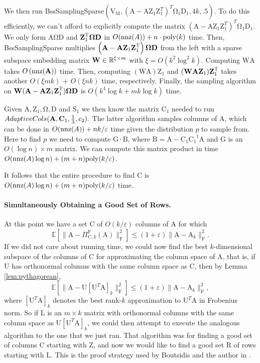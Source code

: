 \documentclass[11pt]{article}
\newcommand{\R}{\ensuremath\mathbb{R}}
\newcommand{\Expect}[1]{\mbox{}{\mathbb{E}}\left[#1\right]}
\newcommand{\FNormS}[1]{\mbox{}\|#1\|_\mathrm{F}^2}
\newcommand{\pinv}[1]{ {#1}^\dagger}
\newcommand{\transp}{^{\textsc{T}}}
\newcommand{\mat}[1]{{\ensuremath{\bm{\mathrm{#1}}}}}
\def\matA{\mat{A}}
\def\matB{\mat{B}}
\def\matC{\mat{C}}
\def\matD{\mat{D}}
\def\matG{\mat{G}}
\def\matL{\mat{L}}
\def\matM{\mat{M}}
\def\matR{\mat{R}}
\def\matS{\mat{S}}
\def\matU{\mat{U}}
\def\matV{\mat{V}}
\def\matW{\mat{W}}
\def\matZ{\mat{Z}}
\def\matOmega{\mat{\Omega}}
\def\matOmega{\mat{\Omega}}
\def\nnz{{ \rm nnz }}
\def\frac#1#2{{#1\over #2}}
\newcommand{\eps}{\varepsilon}
\newcommand{\poly}{{\mathrm{poly}}}
\begin{document}
We then run 
{\textsc BssSamplingSparse}$(\matV_{\matM},  (\matA-\matA\matZ_1\matZ_1^T)^T \mat\Omega_1\matD_1, 4k, .5)$.
To do this efficiently, we can't afford to explicitly compute the matrix
$(\matA-\matA\matZ_1\matZ_1^T)^T \mat\Omega_1\matD_1$. 
We only form  $\matA\matOmega \matD$ and $\matZ_1\transp \matOmega \matD$ in $O(\nnz(A)) + n \cdot \poly(k)$ time. 
Then, {\textsc BssSamplingSparse} multiplies 
$\left(\matA - \matA \matZ_1\matZ_1\transp\right)\matOmega \matD$
from the left with a sparse subspace embedding matrix $\matW \in \R^{\xi \times m}$ with 
$\xi = O( k^2 \log^2 k)$. Computing $\matW \matA$ takes $O\left(  \nnz(\matA) \right)$ time.
Then, computing $(\matW\matA) \matZ_1$ and $(\matW\matA\matZ_1)\matZ_1\transp$ takes another 
$O(\xi m k)$ + $O(\xi n k)$ time, respectively. Finally, the sampling algorithm on
$\matW (\matA - \matA \matZ_1\matZ_1\transp)\matOmega \matD$ is $O( k^4 \log k + m k \log k)$ time.

Given $\matA, \matZ_1, \mat\Omega, \matD$ and $\matS_1$ we then know the matrix $\matC_1$ needed to run
$AdaptiveCols(\matA, \matC_1, \frac{1}{3}, c_2).$ The latter algorithm samples columns of $\matA$,
which can be done in $O(\nnz(A)) + n k/\eps$ time given the distribution $p$ to sample from. Here to find
$p$ we need to compute $\matG \cdot \matB$, where $\matB = \matA-\matC_1 \pinv{\matC_1} \matA$ and $\matG$ is 
an $O(\log n) \times m$ matrix. We can compute this matrix product in time $O(\nnz(A) \log n) + (m+n)\poly(k/\eps)$. 

It follows that the entire procedure to find $\matC$ is $O(\nnz(A) \log n) + (m+n) \poly(k/\eps)$ time. 

\paragraph{Simultaneously Obtaining a Good Set of Rows.}
At this point we have a set $\matC$ of $O(k/\eps)$ columns of $\matA$ for which
$$\Expect{ \FNormS{ \matA - \Pi_{\matC,k}^{\mathrm{F}}(\matA) } } \le (1+\eps) \FNormS{\matA - \matA_k }.$$
If we did not care about running time, we could now find the best $k$-dimensional subspace of the columns of
$\matC$ for approximating the column space of $\matA$, that is, if $\matU$ has orthonormal columns with the
same column space as $\matC$, then by Lemma \ref{lem:pythagorean},
$$\Expect{ \FNormS{ \matA - \matU [\matU^T\matA]_k } }\le (1+\eps) \FNormS{\matA - \matA_k },$$
where $[\matU^T\matA]_k$ denotes the best rank-$k$ approximation to $\matU^T\matA$ in Frobenius norm. So if
$\matL$ is an $m \times k$ matrix with orthonormal columns with the same column space as 
$\matU [\matU^T\matA]_k$, we could then attempt to execute the analogous algorithm to the one that 
we just ran. That algorithm was for finding a good
set of columns $\matC$ starting with $\matZ$, and now we would like to find a good set $\matR$ of rows 
starting with $\matL$. This is the proof strategy used by Boutsidis and the author in \cite{BW14}. 
\end{document}

